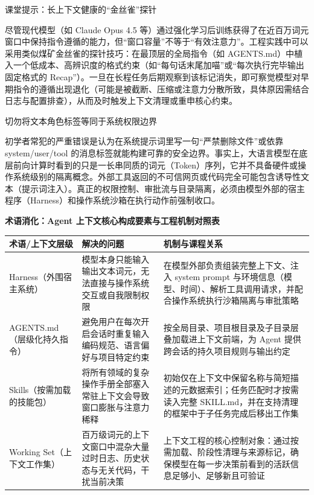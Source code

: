 \documentclass[UTF8,a4paper,11pt,fontset=fandol]{ctexart}
\begin{document}
\begin{knowledgebox}{课堂提示：长上下文健康的“金丝雀”探针}

尽管现代模型（如 Claude Opus 4.5 等）通过强化学习后训练获得了在近百万词元窗口中保持指令遵循的能力，但“窗口容量”不等于“有效注意力”。工程实践中可以采用类似煤矿金丝雀的探针技巧：在最顶层的全局指令（如 AGENTS.md）中植入一个低成本、高辨识度的格式约束（如“每句话末尾加喵”或“每次执行完毕输出固定格式的 Recap”）。一旦在长程任务后期观察到该标记消失，即可察觉模型对早期指令的遵循出现退化（可能是被截断、压缩或注意力分散所致，具体原因需结合日志与配置排查），从而及时触发上下文清理或重申核心约束。

\end{knowledgebox}

\begin{warningbox}{切勿将文本角色标签等同于系统权限边界}

初学者常犯的严重错误是认为在系统提示词里写一句“严禁删除文件”或依靠 system/user/tool 的消息标签就能构建可靠的安全边界。事实上，大语言模型在底层前向计算时看到的只是一长串同质的词元（Token）序列，它并不具备硬件或操作系统级别的隔离概念。外部工具返回的不可信网页或代码完全可能包含诱导性文本（提示词注入）。真正的权限控制、审批流与目录隔离，必须由模型外部的宿主程序（Harness）和操作系统沙箱在执行动作前强制收口。

\end{warningbox}

\par{}\textbf{术语消化：Agent 上下文核心构成要素与工程机制对照表}

\begin{center}\small\begin{tabularx}{\linewidth}{YYY}

\toprule

术语/上下文层级 & 解决的问题 & 机制与课程关系\\\midrule

Harness（外围宿主系统） & 模型本身只能输入输出文本词元，无法直接与操作系统交互或自我限制权限 & 在模型外部负责组装完整上下文、注入 system prompt 与环境信息（模型、时间）、解析工具调用请求，并配合操作系统执行沙箱隔离与审批策略\\[3pt]

AGENTS.md（层级化持久指令） & 避免用户在每次开启会话时重复输入编码规范、语言偏好与项目特定约束 & 按全局目录、项目根目录及子目录层叠加载进上下文前端，为 Agent 提供跨会话的持久项目规则与输出约定\\[3pt]

Skills（按需加载的技能包） & 将所有领域的复杂操作手册全部塞入常驻上下文会导致窗口膨胀与注意力稀释 & 初始仅在上下文中保留名称与简短描述的元数据索引；任务匹配时才按需读入完整 SKILL.md，并在支持清理的框架中于子任务完成后移出工作集\\[3pt]

Working Set（上下文工作集） & 百万级词元的上下文窗口中混杂大量过时日志、历史状态与无关代码，干扰当前决策 & 上下文工程的核心控制对象：通过按需加载、阶段性清理与来源标记，确保模型在每一步决策前看到的活跃信息足够小、足够新且可验证\\[3pt]

\bottomrule\end{tabularx}\end{center}
\end{document}
